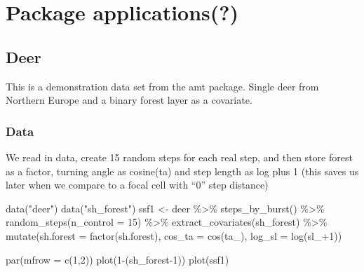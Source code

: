 \documentclass[
]{article}
\newenvironment{Shaded}{\begin{snugshade}}{\end{snugshade}}
\newcommand{\AttributeTok}[1]{\textcolor[rgb]{0.77,0.63,0.00}{#1}}
\newcommand{\DecValTok}[1]{\textcolor[rgb]{0.00,0.00,0.81}{#1}}
\newcommand{\FunctionTok}[1]{\textcolor[rgb]{0.00,0.00,0.00}{#1}}
\newcommand{\NormalTok}[1]{#1}
\newcommand{\OtherTok}[1]{\textcolor[rgb]{0.56,0.35,0.01}{#1}}
\newcommand{\SpecialCharTok}[1]{\textcolor[rgb]{0.00,0.00,0.00}{#1}}
\newcommand{\StringTok}[1]{\textcolor[rgb]{0.31,0.60,0.02}{#1}}
\begin{document}
\hypertarget{package-applications}{%
\section{Package applications(?)}\label{package-applications}}

\hypertarget{deer}{%
\subsection{Deer}\label{deer}}

This is a demonstration data set from the amt package. Single deer from
Northern Europe and a binary forest layer as a covariate.

\hypertarget{data}{%
\subsubsection{Data}\label{data}}

We read in data, create 15 random steps for each real step, and then
store forest as a factor, turning angle as cosine(ta) and step length as
log plus 1 (this saves us later when we compare to a focal cell with
``0'' step distance)

\begin{Shaded}
\begin{Highlighting}[]
\FunctionTok{data}\NormalTok{(}\StringTok{"deer"}\NormalTok{)}
\FunctionTok{data}\NormalTok{(}\StringTok{"sh\_forest"}\NormalTok{)}
\NormalTok{ssf1 }\OtherTok{\textless{}{-}}\NormalTok{ deer }\SpecialCharTok{\%\textgreater{}\%} 
  \FunctionTok{steps\_by\_burst}\NormalTok{() }\SpecialCharTok{\%\textgreater{}\%} 
  \FunctionTok{random\_steps}\NormalTok{(}\AttributeTok{n\_control =} \DecValTok{15}\NormalTok{) }\SpecialCharTok{\%\textgreater{}\%} 
  \FunctionTok{extract\_covariates}\NormalTok{(sh\_forest) }\SpecialCharTok{\%\textgreater{}\%}
  \FunctionTok{mutate}\NormalTok{(}\AttributeTok{sh.forest =} \FunctionTok{factor}\NormalTok{(sh.forest),}
         \AttributeTok{cos\_ta =} \FunctionTok{cos}\NormalTok{(ta\_),}
         \AttributeTok{log\_sl =} \FunctionTok{log}\NormalTok{(sl\_}\SpecialCharTok{+}\DecValTok{1}\NormalTok{))}

\FunctionTok{par}\NormalTok{(}\AttributeTok{mfrow =} \FunctionTok{c}\NormalTok{(}\DecValTok{1}\NormalTok{,}\DecValTok{2}\NormalTok{))}
\FunctionTok{plot}\NormalTok{(}\DecValTok{1}\SpecialCharTok{{-}}\NormalTok{(sh\_forest}\DecValTok{{-}1}\NormalTok{))}
\FunctionTok{plot}\NormalTok{(ssf1)}
\end{Highlighting}
\end{Shaded}
\end{document}
